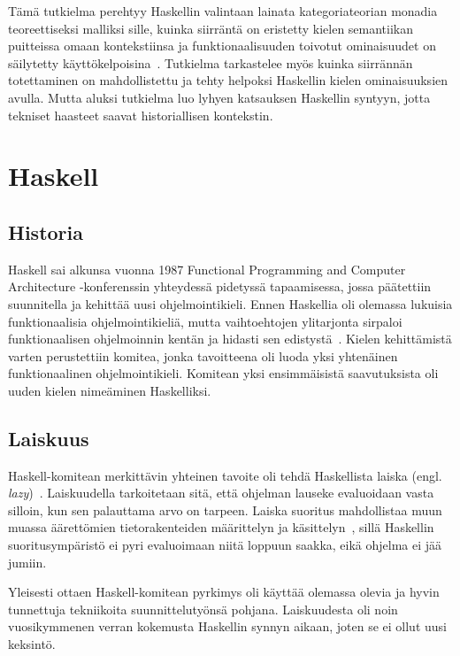 \documentclass[finnish]{tktltiki2}
\begin{document}
Tämä tutkielma perehtyy Haskellin valintaan lainata kategoriateorian monadia teoreettiseksi malliksi
sille, kuinka siirräntä on eristetty kielen semantiikan puitteissa omaan kontekstiinsa ja
funktionaalisuuden toivotut ominaisuudet on säilytetty käyttökelpoisina~\cite{ifp93}. Tutkielma
tarkastelee myös kuinka siirrännän totettaminen on mahdollistettu ja tehty helpoksi Haskellin kielen
ominaisuuksien avulla. Mutta aluksi tutkielma luo lyhyen katsauksen Haskellin syntyyn, jotta
tekniset haasteet saavat historiallisen kontekstin.


\section{Haskell}

\subsection{Historia}

Haskell sai alkunsa vuonna 1987 Functional Programming and Computer Architecture -konferenssin
yhteydessä pidetyssä tapaamisessa, jossa päätettiin suunnitella ja kehittää uusi ohjelmointikieli.
Ennen Haskellia oli olemassa lukuisia funktionaalisia ohjelmointikieliä, mutta vaihtoehtojen
ylitarjonta sirpaloi funktionaalisen ohjelmoinnin kentän ja hidasti sen edistystä~\cite{hoh07}.
Kielen kehittämistä varten perustettiin komitea, jonka tavoitteena oli luoda yksi yhtenäinen
funktionaalinen ohjelmointikieli. Komitean yksi ensimmäisistä saavutuksista oli uuden kielen
nimeäminen Haskelliksi.

\subsection{Laiskuus}
\label{subsec:laiskuus}

Haskell-komitean merkittävin yhteinen tavoite oli tehdä Haskellista laiska (engl.
\emph{lazy})~\cite{hoh07}. Laiskuudella tarkoitetaan sitä, että ohjelman lauseke evaluoidaan vasta
silloin, kun sen palauttama arvo on tarpeen. Laiska suoritus mahdollistaa muun muassa äärettömien
tietorakenteiden määrittelyn ja käsittelyn~\cite{cons76}, sillä Haskellin suoritusympäristö ei pyri
evaluoimaan niitä loppuun saakka, eikä ohjelma ei jää jumiin.

Yleisesti ottaen Haskell-komitean pyrkimys oli käyttää olemassa olevia ja hyvin tunnettuja
tekniikoita suunnittelutyönsä pohjana. Laiskuudesta oli noin vuosikymmenen verran kokemusta
Haskellin synnyn aikaan, joten se ei ollut uusi keksintö.
\end{document}
